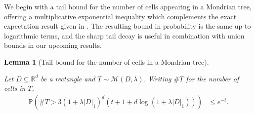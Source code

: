 \documentclass[11pt,lof]{puthesis}
\renewcommand{\P}{\ensuremath{\mathbb{P}}}
\newcommand{\R}{\ensuremath{\mathbb{R}}}
\newcommand{\cM}{\ensuremath{\mathcal{M}}}
\theoremstyle{break}
\newtheorem{lemma}{Lemma}[section]
\theoremstyle{proof}
\begin{document}
We begin with a tail bound for the number of cells appearing
in a Mondrian tree, offering a multiplicative
exponential inequality which
complements the exact expectation result given in
\citet[Proposition~2]{mourtada2020minimax}.
The resulting bound in probability is the same up to
logarithmic terms, and the sharp tail decay is useful
in combination with union bounds in our upcoming results.

\begin{lemma}[Tail bound for the number of cells in a Mondrian tree]
  \label{lem:mondrian_app_cells_tail}

  Let $D \subseteq \R^d$ be a rectangle and
  $T \sim \cM(D, \lambda)$. Writing
  $\# T$ for the number of cells in $T$,
  \begin{align*}
    \P\left(
      \# T > 3 (1 + \lambda |D|_1)^d
      (t + 1 + d \log(1 + \lambda |D|_1))
    \right)
    &\leq
    e^{-t}.
  \end{align*}

\end{lemma}
\end{document}

